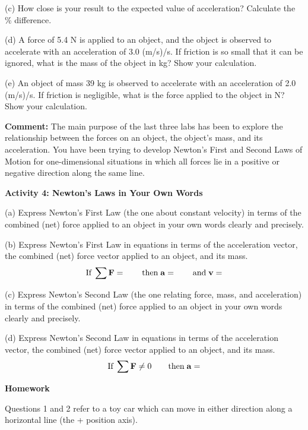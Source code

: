 {(c) How close is your result to the expected value of acceleration? Calculate
the \% difference.
\vspace{20mm}

(d) A force of 5.4 N is applied to an object, and the object is observed to
accelerate with an acceleration of 3.0 (m/s)/s. If friction is so small that it
can be ignored, what is the mass of the object in kg? Show your calculation.
\vspace{20mm}

(e) An object of mass 39 kg is observed to accelerate with an acceleration of
2.0 (m/s)/s. If friction is negligible, what is the force applied to the object
in N? Show your calculation.
\vspace{20mm}

\textbf{Comment:} The main purpose of the last three labs has been to explore
the relationship between the forces on an object, the object's mass, and its
acceleration. You have been trying to develop Newton's First and Second Laws
of Motion for one-dimensional situations in which all forces lie in a positive
or negative direction along the same line. 

\pagebreak[2]
\textbf{Activity 4: Newton's Laws in Your Own Words} 

(a) Express Newton's First Law (the one about constant velocity) in terms of
the combined (net) force applied to an object in your own words clearly and
precisely.
\vspace{20mm}

(b) Express Newton's First Law in equations in terms of the acceleration vector,
the combined (net) force vector applied to an object, and its mass.
\[
\mbox{If}\; \sum {\bf F}= \qquad \mbox{then}\; {\bf a}=
\qquad \mbox{and}\; {\bf v}=\]


(c) Express Newton's Second Law (the one relating force, mass, and acceleration)
in terms of the combined (net) force applied to an object in your own words
clearly and precisely.
\vspace{20mm}

(d) Express Newton's Second Law in equations in terms of the acceleration vector,
the combined (net) force vector applied to an object, and its mass.
\[
\mbox{If}\; \sum {\bf F}\neq 0\qquad \mbox{then}\; 
{\bf a}=\]


\textbf{Homework} 

Questions 1 and 2 refer to a toy car which can move in either direction along
a horizontal line (the + position axis).

}
